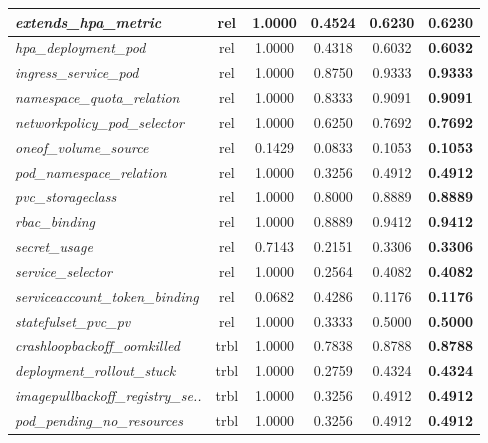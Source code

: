 \begin{footnotesize}
\begin{longtable}{|p{3.6cm}|c|c|c|c|c|}
\hline
\textit{extends\_\allowbreak{}hpa\_\allowbreak{}metric} & rel & 1.0000 & 0.4524 & 0.6230 & \textbf{0.6230} \\
\hline
\textit{hpa\_\allowbreak{}deployment\_\allowbreak{}pod} & rel & 1.0000 & 0.4318 & 0.6032 & \textbf{0.6032} \\
\hline
\textit{ingress\_\allowbreak{}service\_\allowbreak{}pod} & rel & 1.0000 & 0.8750 & 0.9333 & \textbf{0.9333} \\
\hline
\textit{namespace\_\allowbreak{}quota\_\allowbreak{}relation} & rel & 1.0000 & 0.8333 & 0.9091 & \textbf{0.9091} \\
\hline
\textit{networkpolicy\_\allowbreak{}pod\_\allowbreak{}selector} & rel & 1.0000 & 0.6250 & 0.7692 & \textbf{0.7692} \\
\hline
\textit{oneof\_\allowbreak{}volume\_\allowbreak{}source} & rel & 0.1429 & 0.0833 & 0.1053 & \textbf{0.1053} \\
\hline
\textit{pod\_\allowbreak{}namespace\_\allowbreak{}relation} & rel & 1.0000 & 0.3256 & 0.4912 & \textbf{0.4912} \\
\hline
\textit{pvc\_\allowbreak{}storageclass} & rel & 1.0000 & 0.8000 & 0.8889 & \textbf{0.8889} \\
\hline
\textit{rbac\_\allowbreak{}binding} & rel & 1.0000 & 0.8889 & 0.9412 & \textbf{0.9412} \\
\hline
\textit{secret\_\allowbreak{}usage} & rel & 0.7143 & 0.2151 & 0.3306 & \textbf{0.3306} \\
\hline
\textit{service\_\allowbreak{}selector} & rel & 1.0000 & 0.2564 & 0.4082 & \textbf{0.4082} \\
\hline
\textit{serviceaccount\_\allowbreak{}token\_\allowbreak{}binding} & rel & 0.0682 & 0.4286 & 0.1176 & \textbf{0.1176} \\
\hline
\textit{statefulset\_\allowbreak{}pvc\_\allowbreak{}pv} & rel & 1.0000 & 0.3333 & 0.5000 & \textbf{0.5000} \\
\hline
\textit{crashloopbackoff\_\allowbreak{}oomkilled} & trbl & 1.0000 & 0.7838 & 0.8788 & \textbf{0.8788} \\
\hline
\textit{deployment\_\allowbreak{}rollout\_\allowbreak{}stuck} & trbl & 1.0000 & 0.2759 & 0.4324 & \textbf{0.4324} \\
\hline
\textit{imagepullbackoff\_\allowbreak{}registry\_\allowbreak{}se..} & trbl & 1.0000 & 0.3256 & 0.4912 & \textbf{0.4912} \\
\hline
\textit{pod\_\allowbreak{}pending\_\allowbreak{}no\_\allowbreak{}resources} & trbl & 1.0000 & 0.3256 & 0.4912 & \textbf{0.4912} \\

\end{longtable}
\end{footnotesize}
